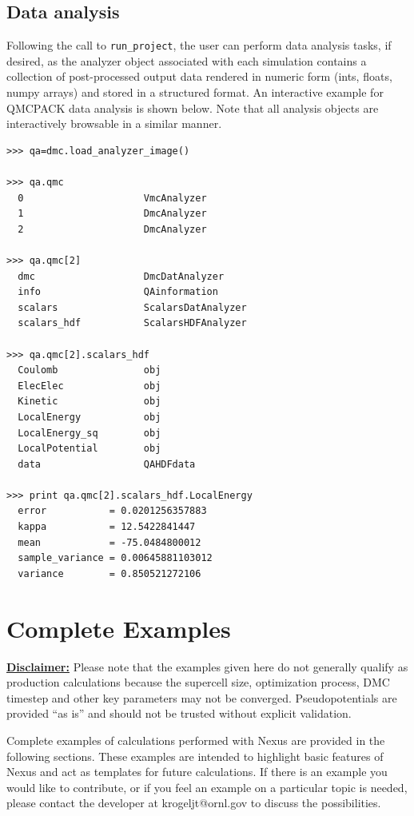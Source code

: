 \documentclass[oneside,11pt]{memoir}
\numberwithin{equation}{section}
\newcommand{\bu}[1]{\textbf{\underline{#1}}}
\begin{document}
\section{Data analysis}\label{sec:user_data_analysis}
Following the call to \texttt{run\_project}, the user can perform data analysis tasks, if desired, as the analyzer object associated with each simulation contains a collection of post-processed output data rendered in numeric form (ints, floats, numpy arrays) and stored in a structured format.  An interactive example for QMCPACK data analysis is shown below.  Note that all analysis objects are interactively browsable in a similar manner.
\begin{shaded}
\begin{verbatim}
>>> qa=dmc.load_analyzer_image()

>>> qa.qmc
  0                     VmcAnalyzer
  1                     DmcAnalyzer
  2                     DmcAnalyzer

>>> qa.qmc[2]
  dmc                   DmcDatAnalyzer
  info                  QAinformation
  scalars               ScalarsDatAnalyzer
  scalars_hdf           ScalarsHDFAnalyzer

>>> qa.qmc[2].scalars_hdf
  Coulomb               obj
  ElecElec              obj
  Kinetic               obj
  LocalEnergy           obj
  LocalEnergy_sq        obj
  LocalPotential        obj
  data                  QAHDFdata

>>> print qa.qmc[2].scalars_hdf.LocalEnergy
  error           = 0.0201256357883
  kappa           = 12.5422841447
  mean            = -75.0484800012
  sample_variance = 0.00645881103012
  variance        = 0.850521272106
\end{verbatim}
\end{shaded}






\pagebreak
\chapter{Complete Examples} \label{sec:examples}

\bu{Disclaimer:} Please note that the examples given here do not generally qualify as production 
calculations because the supercell size, optimization process, DMC timestep and 
other key parameters may not be converged.  Pseudopotentials are provided 
``as is'' and should not be trusted without explicit validation.

Complete examples of calculations performed with Nexus are provided 
in the following sections.  These examples are intended to highlight basic 
features of Nexus and act as templates for future calculations.  
If there is an example you 
would like to contribute, or if you feel an example on a particular topic is 
needed, please contact the developer at krogeljt@ornl.gov to discuss the 
possibilities.  
\end{document}
